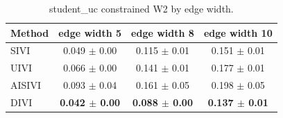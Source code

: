 \begin{table}[t]
\centering
\caption{student_uc constrained W2 by edge width.}
\label{tab:student-edge-w2}
\begin{tabular}{lccc}
\toprule
Method & edge width 5 & edge width 8 & edge width 10 \\
\midrule
SIVI & 0.049 $\pm$ 0.00 & 0.115 $\pm$ 0.01 & 0.151 $\pm$ 0.01 \\
UIVI & 0.066 $\pm$ 0.00 & 0.141 $\pm$ 0.01 & 0.177 $\pm$ 0.01 \\
AISIVI & 0.093 $\pm$ 0.04 & 0.161 $\pm$ 0.05 & 0.198 $\pm$ 0.05 \\
DIVI & \textbf{0.042 $\pm$ 0.00} & \textbf{0.088 $\pm$ 0.00} & \textbf{0.137 $\pm$ 0.01} \\
\bottomrule
\end{tabular}
\end{table}
